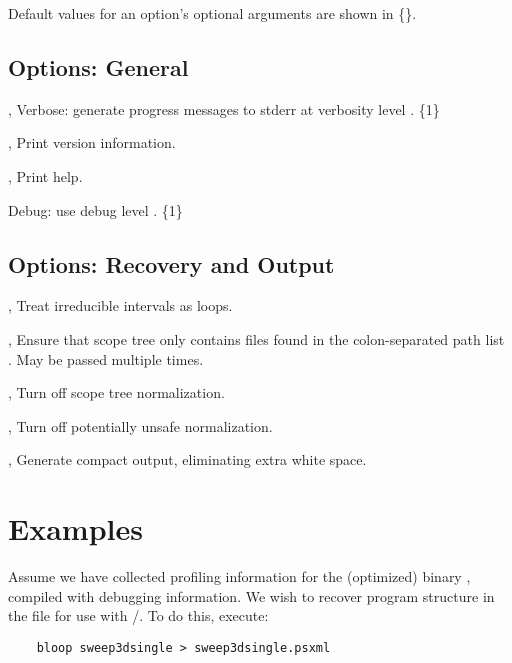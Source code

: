 \documentclass[english]{article}
\begin{document}
Default values for an option's optional arguments are shown in \{\}.

\subsection{Options: General}

\begin{Description}
\item[\OptoArg{-v}{n}, \OptoArg{--verbose}{n}] Verbose: generate progress messages to stderr at verbosity level .  \{1\}
\item[\Opt{-V}, \Opt{--version}] Print version information.
\item[\Opt{-h}, \Opt{--help}] Print help.
\item[\OptoArg{--debug}{n}]   Debug: use debug level . \{1\}
\end{Description}

\subsection{Options: Recovery and Output}

\begin{Description}
  \item[\Opt{-i}, \Opt{--irreducible-interval-as-loop}] Treat irreducible intervals as loops.
  \item[\OptArg{-p}{path-list}, \OptArg{--canonical-paths}{path-list}] Ensure that scope tree only contains files found in the colon-separated path list . May be passed multiple times.

\item[\Opt{-n}, \Opt{--normalize-off}] Turn off scope tree normalization.
\item[\Opt{-u}, \Opt{--unsafe-normalize-off}] Turn off potentially unsafe normalization.

\item[\Opt{-c}, \Opt{--compact}] Generate compact output, eliminating extra white space.
\end{Description}

\section{Examples}

Assume we have collected profiling information for the (optimized) binary , compiled with debugging information.
We wish to recover program structure in the file  for use with /.
To do this, execute:
\begin{verbatim}
    bloop sweep3dsingle > sweep3dsingle.psxml
\end{verbatim}
\end{document}
